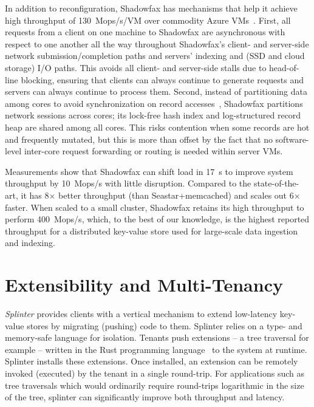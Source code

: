 In addition to reconfiguration, Shadowfax has mechanisms that help it
achieve high throughput of 130~Mops/s/VM over
commodity Azure VMs~\cite{azure}.
%
First, all requests from a client on one machine to Shadowfax are asynchronous with
respect to one another all the way throughout Shadowfax's client- and
server-side network submission/completion paths and servers' indexing and
(SSD and cloud storage) I/O paths.
%
This avoids all client- and server-side stalls due to head-of-line
blocking, ensuring that clients can always continue to generate requests and
servers can always continue to process them.
%
Second, instead of partitioning data among cores to avoid synchronization on record
accesses~\cite{hstore,voltdb,mica,seastar}, Shadowfax partitions network
sessions across cores; its lock-free hash index and log-structured record heap
are shared among all cores.
%
This risks contention when some records are hot and frequently
mutated, but this is more than offset by the fact that no software-level
inter-core request forwarding or routing is needed within server VMs.

Measurements show that Shadowfax can shift load in 17~s to improve system throughput by
10~Mops/s
with little disruption. Compared to the state-of-the-art, it has 8$\times{}$ better throughput
  (than Seastar+memcached) and scales out 6$\times{}$ faster.
%
When scaled to a small cluster, Shadowfax retains its high throughput to
perform 400~Mops/s,
%
which, to the best of our knowledge, is the highest
reported throughput for a distributed key-value store used for
large-scale data ingestion and indexing.

\section{Extensibility and Multi-Tenancy}

\emph{Splinter} provides clients with a vertical mechanism
to extend low-latency key-value stores by migrating (pushing) code to them.
%
Splinter relies on a type- and memory-safe language for isolation.
%
Tenants push
extensions – a tree traversal for example – written in the Rust
programming language~\cite{rust} to the system at runtime.
%
Splinter installs
these extensions.
%
Once installed, an extension can
be remotely invoked (executed) by the tenant in a
single round-trip.
%
For applications such as tree traversals which would ordinarily require
round-trips logarithmic in the size of the tree, splinter can
significantly improve both throughput and latency.

